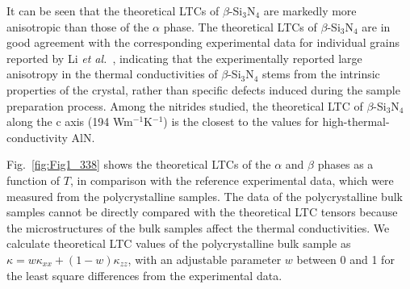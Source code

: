 \documentclass[twocolumn,amsmath,amssymb,a4paper,prb,superscriptaddress,floatfix]{revtex4-1}
\begin{document}
It can be seen that the theoretical LTCs of $\beta$-Si$_3$N$_4$ are markedly
more anisotropic than those of the $\alpha$ phase. The theoretical LTCs of
$\beta$-Si$_3$N$_4$ are in good agreement with the corresponding experimental
data for individual grains reported by Li {\it et al.}~\cite{li}, indicating
that the experimentally reported large anisotropy in the thermal conductivities
of $\beta$-Si$_3$N$_4$ stems from the intrinsic properties of the crystal,
rather than specific defects induced during the sample preparation process.
Among the nitrides studied, the theoretical LTC of $\beta$-Si$_3$N$_4$ along
the c axis (194 Wm$^{-1}$K$^{-1}$) is the closest to the values for
high-thermal-conductivity AlN. 

Fig.~\ref{fig:Fig1_338} shows the theoretical LTCs of the $\alpha$  and $\beta$
phases as a function of $T$, in comparison with the reference experimental
data, which were measured from the polycrystalline samples. The data of the
polycrystalline bulk samples cannot be directly compared with the theoretical
LTC tensors because the microstructures of the bulk samples affect the thermal
conductivities.  We calculate theoretical LTC values of the polycrystalline
bulk sample as $\kappa = w\kappa_{xx} + (1-w) \kappa_{zz}$, with an adjustable
parameter $w$ between 0 and 1 for the least square differences from the
experimental data.
\end{document}
